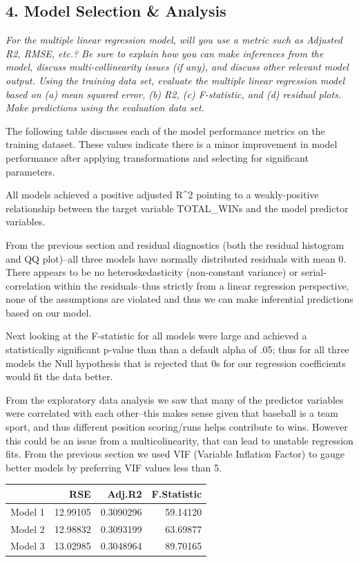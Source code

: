 \documentclass[
]{article}
\begin{document}
\hypertarget{model-selection-analysis}{%
\subsection{4. Model Selection \&
Analysis}\label{model-selection-analysis}}

\emph{For the multiple linear regression model, will you use a metric
such as Adjusted R2, RMSE, etc.? Be sure to explain how you can make
inferences from the model, discuss multi-collinearity issues (if any),
and discuss other relevant model output. Using the training data set,
evaluate the multiple linear regression model based on (a) mean squared
error, (b) R2, (c) F-statistic, and (d) residual plots. Make predictions
using the evaluation data set.}

The following table discusses each of the model performance metrics on
the training dataset. These values indicate there is a minor improvement
in model performance after applying transformations and selecting for
significant parameters.

All models achieved a positive adjusted R\^{}2 pointing to a
weakly-positive relationship between the target variable TOTAL\_WINs and
the model predictor variables.

From the previous section and residual diagnostics (both the residual
histogram and QQ plot)--all three models have normally distributed
residuals with mean 0. There appears to be no heteroskedasticity
(non-constant variance) or serial-correlation within the residuals--thus
strictly from a linear regression perspective, none of the assumptions
are violated and thus we can make inferential predictions based on our
model.

Next looking at the F-statistic for all models were large and achieved a
statistically significant p-value than than a default alpha of .05; thus
for all three models the Null hypothesis that is rejected that 0s for
our regression coefficients would fit the data better.

From the exploratory data analysis we saw that many of the predictor
variables were correlated with each other--this makes sense given that
baseball is a team sport, and thus different position scoring/runs helps
contribute to wins. However this could be an issue from a
multicolinearity, that can lead to unstable regression fits. From the
previous section we used VIF (Variable Inflation Factor) to gauge better
models by preferring VIF values less than 5.

\begin{table}[H]
\centering
\begin{tabular}{l|r|r|r}
\hline
  & RSE & Adj.R2 & F.Statistic\\
\hline
Model 1 & 12.99105 & 0.3090296 & 59.14120\\
\hline
Model 2 & 12.98832 & 0.3093199 & 63.69877\\
\hline
Model 3 & 13.02985 & 0.3048964 & 89.70165\\
\hline
\end{tabular}
\end{table}
\end{document}
